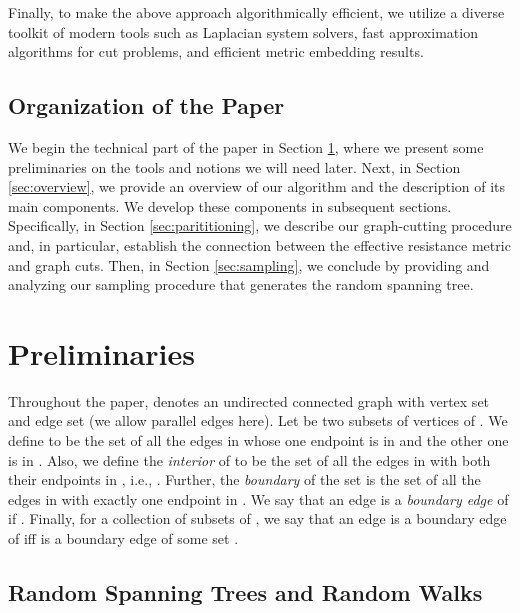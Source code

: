 \documentclass[11pt, letterpaper]{article}
\begin{document}
Finally, to make the above approach algorithmically efficient, we utilize a diverse toolkit of modern tools such as Laplacian system solvers, fast approximation algorithms for cut problems, and efficient metric embedding results. 
 
 
   




\subsection{Organization of the Paper}
We begin the technical part of the paper in Section \ref{sec:preliminaries}, where we present some preliminaries on the tools and notions we will need later. Next, in Section \ref{sec:overview}, we provide an overview of our algorithm and the description of its main components. We develop these components in subsequent sections. Specifically, in Section \ref{sec:parititioning}, we describe our graph-cutting procedure and, in particular, establish the connection between the effective resistance metric and graph cuts. Then, in Section \ref{sec:sampling}, we conclude by providing and analyzing our sampling procedure that generates the random spanning tree.
  
  









   \section{Preliminaries} \label{sec:preliminaries}
 

Throughout the paper,  denotes an undirected connected graph with vertex set  and edge set  (we allow parallel edges here). Let  be two subsets of vertices of . We define  to be the set of all the edges in  whose one endpoint is in  and the other one is in . Also, we define the {\em interior } of  to be the set of all the edges in  with both their endpoints in , i.e., . Further, the {\em boundary } of the set  is the set of all the edges in  with exactly one endpoint in . We say that an edge  is a {\em boundary edge} of  if . Finally, for a collection  of subsets of , we say that an edge  is a boundary edge of  iff  is a boundary edge of some set .

\subsection{Random Spanning Trees and Random Walks}
\end{document}
